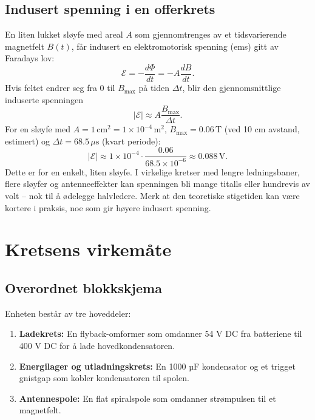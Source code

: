 \documentclass{article}
\begin{document}
\subsection{Indusert spenning i en offerkrets}
En liten lukket sløyfe med areal $A$ som gjennomtrenges av et tidsvarierende magnetfelt $B(t)$, får indusert en elektromotorisk spenning (ems) gitt av Faradays lov:
\begin{equation}
\mathcal{E} = -\frac{d\Phi}{dt} = -A \frac{dB}{dt}.
\end{equation}
Hvis feltet endrer seg fra 0 til $B_{\text{max}}$ på tiden $\Delta t$, blir den gjennomsnittlige induserte spenningen
\begin{equation}
|\mathcal{E}| \approx A \frac{B_{\text{max}}}{\Delta t}.
\end{equation}
For en sløyfe med $A = 1\,\text{cm}^2 = 1\times10^{-4}\,\text{m}^2$, $B_{\text{max}} = 0.06\,\text{T}$ (ved 10 cm avstand, estimert) og $\Delta t = 68.5\,\mu\text{s}$ (kvart periode):
\begin{equation}
|\mathcal{E}| \approx 1\times10^{-4} \cdot \frac{0.06}{68.5\times10^{-6}} \approx 0.088\,\text{V}.
\end{equation}
Dette er for en enkelt, liten sløyfe. I virkelige kretser med lengre ledningsbaner, flere sløyfer og antenneeffekter kan spenningen bli mange titalls eller hundrevis av volt – nok til å ødelegge halvledere. Merk at den teoretiske stigetiden kan være kortere i praksis, noe som gir høyere indusert spenning.

\section{Kretsens virkemåte}

\subsection{Overordnet blokkskjema}
Enheten består av tre hoveddeler:
\begin{enumerate}
\item \textbf{Ladekrets:} En flyback-omformer som omdanner 54 V DC fra batteriene til 400 V DC for å lade hovedkondensatoren.
\item \textbf{Energilager og utladningskrets:} En 1000 µF kondensator og et trigget gnistgap som kobler kondensatoren til spolen.
\item \textbf{Antennespole:} En flat spiralspole som omdanner strømpulsen til et magnetfelt.
\end{enumerate}
\end{document}
